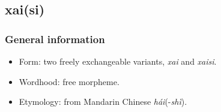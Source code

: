 \subsection{xai(si)}

\subsubsection{General information}
\begin{itemize}
	\item Form: two freely exchangeable variants, \textit{xai} and \textit{xaisi}.
	\item Wordhood: free morpheme.
	\item Etymology: from Mandarin Chinese \mbox{\textit{hái}(-\textit{shì}}).
\end{itemize}


